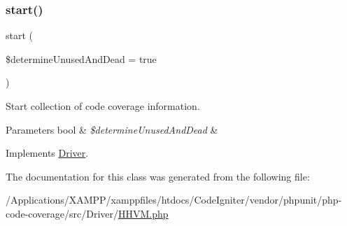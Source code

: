 \subsubsection{\texorpdfstring{start()}{start()}}
{\footnotesize\ttfamily start (\begin{DoxyParamCaption}\item[{}]{\$determine\+Unused\+And\+Dead = {\ttfamily true} }\end{DoxyParamCaption})}

Start collection of code coverage information.


\begin{DoxyParams}[1]{Parameters}
bool & {\em \$determine\+Unused\+And\+Dead} & \\
\hline
\end{DoxyParams}


Implements \mbox{\hyperlink{interface_sebastian_bergmann_1_1_code_coverage_1_1_driver_1_1_driver_aa3dfff26cb483c3eadbf2418e1729671}{Driver}}.



The documentation for this class was generated from the following file\+:\begin{DoxyCompactItemize}
\item 
/\+Applications/\+X\+A\+M\+P\+P/xamppfiles/htdocs/\+Code\+Igniter/vendor/phpunit/php-\/code-\/coverage/src/\+Driver/\mbox{\hyperlink{_h_h_v_m_8php}{H\+H\+V\+M.\+php}}\end{DoxyCompactItemize}
